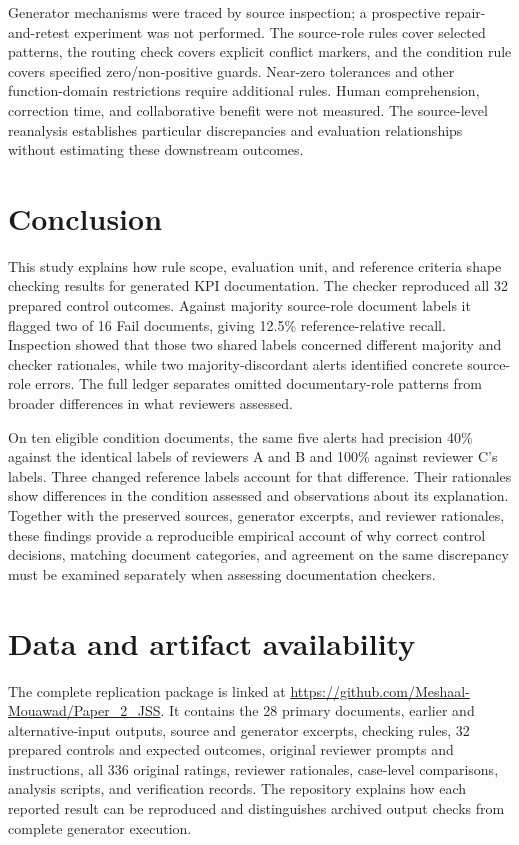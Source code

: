 \documentclass[a4paper,fleqn]{cas-dc}
\begin{document}
Generator mechanisms were traced by source inspection; a prospective repair-and-retest experiment was not performed. The source-role rules cover selected patterns, the routing check covers explicit conflict markers, and the condition rule covers specified zero/non-positive guards. Near-zero tolerances and other function-domain restrictions require additional rules. Human comprehension, correction time, and collaborative benefit were not measured. The source-level reanalysis establishes particular discrepancies and evaluation relationships without estimating these downstream outcomes.

\section{Conclusion}
This study explains how rule scope, evaluation unit, and reference criteria shape checking results for generated KPI documentation. The checker reproduced all 32 prepared control outcomes. Against majority source-role document labels it flagged two of 16 Fail documents, giving 12.5\% reference-relative recall. Inspection showed that those two shared labels concerned different majority and checker rationales, while two majority-discordant alerts identified concrete source-role errors. The full ledger separates omitted documentary-role patterns from broader differences in what reviewers assessed.

On ten eligible condition documents, the same five alerts had precision 40\% against the identical labels of reviewers A and B and 100\% against reviewer C's labels. Three changed reference labels account for that difference. Their rationales show differences in the condition assessed and observations about its explanation. Together with the preserved sources, generator excerpts, and reviewer rationales, these findings provide a reproducible empirical account of why correct control decisions, matching document categories, and agreement on the same discrepancy must be examined separately when assessing documentation checkers.

\section*{Data and artifact availability}
The complete replication package is linked at \url{https://github.com/Meshaal-Mouawad/Paper_2_JSS}. It contains the 28 primary documents, earlier and alternative-input outputs, source and generator excerpts, checking rules, 32 prepared controls and expected outcomes, original reviewer prompts and instructions, all 336 original ratings, reviewer rationales, case-level comparisons, analysis scripts, and verification records. The repository explains how each reported result can be reproduced and distinguishes archived output checks from complete generator execution.
\end{document}
